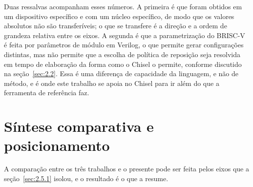 Duas ressalvas acompanham esses números. A primeira é que foram obtidos em um dispositivo específico e com um núcleo específico, de modo que os valores absolutos não são transferíveis; o que se transfere é a direção e a ordem de grandeza relativa entre os eixos. A segunda é que a parametrização do BRISC-V é feita por parâmetros de módulo em Verilog, o que permite gerar configurações distintas, mas não permite que a escolha de política de reposição seja resolvida em tempo de elaboração da forma como o Chisel o permite, conforme discutido na seção~\ref{sec:2.2}. Essa é uma diferença de capacidade da linguagem, e não de método, e é onde este trabalho se apoia no Chisel para ir além do que a ferramenta de referência faz.

\section{Síntese comparativa e posicionamento}\label{sec:3.4}

A comparação entre os três trabalhos e o presente pode ser feita pelos eixos que a seção~\ref{sec:2.5.1} isolou, e o resultado é o que a  resume.

